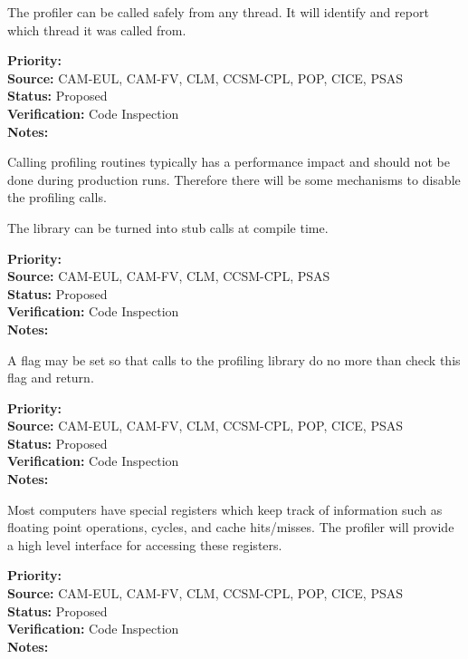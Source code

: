 The profiler can be called safely from any thread.  It will 
identify and report which thread it was called from.

\begin{reqlist}
{\bf Priority:}  \\
{\bf Source:} CAM-EUL, CAM-FV, CLM, CCSM-CPL, POP, CICE, PSAS \\
{\bf Status:} Proposed \\
{\bf Verification:} Code Inspection \\
{\bf Notes:} 
\end{reqlist}


Calling profiling routines typically has a performance impact and should not
be done during production runs.  Therefore there will be some mechanisms to 
disable the profiling calls.


The library can be turned into stub calls at compile time.

\begin{reqlist}
{\bf Priority:}  \\
{\bf Source:} CAM-EUL, CAM-FV, CLM, CCSM-CPL, PSAS \\
{\bf Status:} Proposed \\
{\bf Verification:} Code Inspection \\
{\bf Notes:} 
\end{reqlist}


A flag may be set so that calls to the profiling library do no more than check
this flag and return.

\begin{reqlist}
{\bf Priority:}  \\
{\bf Source:} CAM-EUL, CAM-FV, CLM, CCSM-CPL, POP, CICE, PSAS \\
{\bf Status:} Proposed \\
{\bf Verification:} Code Inspection \\
{\bf Notes:} 
\end{reqlist}


Most computers have special registers which keep track of information such
as floating point operations, cycles, and cache hits/misses.  The profiler will
provide a high level interface for accessing these registers.

\begin{reqlist}
{\bf Priority:}  \\
{\bf Source:} CAM-EUL, CAM-FV, CLM, CCSM-CPL, POP, CICE, PSAS \\
{\bf Status:} Proposed \\
{\bf Verification:} Code Inspection \\
{\bf Notes:} 
\end{reqlist}
